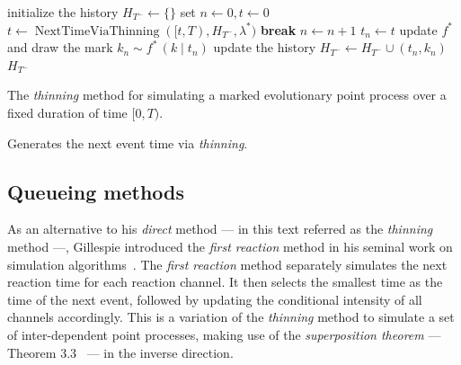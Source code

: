 \documentclass{juliacon}
\newcommand\ubar[1]{\stackunder[1.2pt]{\(#1\)}{\rule{.8ex}{.075ex}}}
\begin{document}
\begin{algorithm}[h]
\begin{algorithmic}[1]
  \Procedure{ThinningMethod}{\( [0, T) \), \( \lambda^\ast \), \( f^\ast \),}
    \State initialize the history \( H_{T^-} \leftarrow \{ \} \)
    \State set \( n \leftarrow 0, t \leftarrow 0 \)
      \State \( t \leftarrow \operatorname{NextTimeViaThinning}([t, T), H_{T^-}, \lambda^\ast) \)
        \State \textbf{break}
      \EndIf
      \State \( n \leftarrow n + 1 \)
      \State \( t_n \leftarrow t \)
      \State update  \( f^\ast \) and draw the mark \( k_n \sim f^\ast \, (k \mid t_n) \)
      \State update the history \( H_{T^-} \leftarrow H_{T^-} \cup (t_n, k_n) \)
    \EndWhile
    \State \Return \( H_{T^-} \)
  \EndProcedure
\end{algorithmic}
\caption{The \textit{thinning} method for simulating a marked evolutionary point process over a fixed duration of time \( [0, T) \).}
\label{algo:sim-thinning}
\end{algorithm}

\begin{algorithm}[h]
\begin{algorithmic}[1]
  \Procedure{NextTimeViaThinning}{\([t, T) \), \( \lambda^\ast \), \( H_{t} \),}
        \State update \( \lambda^\ast \)
        \State find \( \bar{M}^\ast (t) \), \( \ubar{M}^\ast (t) \) and \( L^\ast(t) \) which satisfies Equation~\ref{eq:thinning-condition}
        \State draw \( u \sim \exp(1 \; / \; \bar{M}^\ast(t)) \) and \( v \sim U[0, 1] \)
        \If{\( u > L^\ast(t) \)}
          \State \( t \leftarrow t + L^\ast(t) \)
          \State \textbf{next}
        \EndIf
        \If{\( ( v > \ubar{M}^\ast(t) ) \) and \( ( v > \lambda^\ast \, (t + u) \; / \; \bar{M}^\ast(t) ) \)}
          \State \( t \leftarrow t + u \)
          \State \textbf{next}
        \EndIf
        \State \( t \leftarrow t + u \)
        \State \textbf{break}
      \EndWhile
      \State \Return \( t \)
  \EndProcedure
\end{algorithmic}
\caption{Generates the next event time via \textit{thinning}.}
\label{algo:next-time-thinning}
\end{algorithm}

\subsection{Queueing methods} \label{subsec:sim-first}

As an alternative to his \textit{direct} method --- in this text referred as the \textit{thinning} method ---, Gillespie introduced the \textit{first reaction} method in his seminal work on simulation algorithms~\cite{gillespie1976}. The \textit{first reaction} method separately simulates the next reaction time for each reaction channel. It then selects the smallest time as the time of the next event, followed by updating the conditional intensity of all channels accordingly. This is a variation of the \textit{thinning} method to simulate a set of inter-dependent point processes, making use of the \textit{superposition theorem} --- Theorem 3.3~\cite{last2017} --- in the inverse direction.
\end{document}

